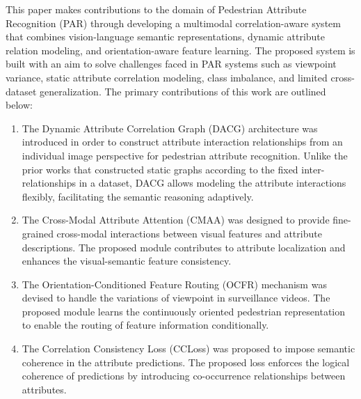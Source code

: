 \documentclass{ieeeaccess}
\begin{document}
This paper makes contributions to the domain of Pedestrian Attribute Recognition (PAR) through developing a multimodal correlation-aware system that combines vision-language semantic representations, dynamic attribute relation modeling, and orientation-aware feature learning. The proposed system is built with an aim to solve challenges faced in PAR systems such as viewpoint variance, static attribute correlation modeling, class imbalance, and limited cross-dataset generalization. The primary contributions of this work are outlined below:
\begin{enumerate}

    \item The Dynamic Attribute Correlation Graph (DACG) architecture was introduced in order to construct attribute interaction relationships from an individual image perspective for pedestrian attribute recognition. Unlike the prior works that constructed static graphs according to the fixed inter-relationships in a dataset, DACG allows modeling the attribute interactions flexibly, facilitating the semantic reasoning adaptively.
    \item The Cross-Modal Attribute Attention (CMAA) was designed to provide fine-grained cross-modal interactions between visual features and attribute descriptions. The proposed module contributes to attribute localization and enhances the visual-semantic feature consistency.
     \item The Orientation-Conditioned Feature Routing (OCFR) mechanism was devised to handle the variations of viewpoint in surveillance videos. The proposed module learns the continuously oriented pedestrian representation to enable the routing of feature information conditionally.
     \item The Correlation Consistency Loss (CCLoss) was proposed to impose semantic coherence in the attribute predictions. The proposed loss enforces the logical coherence of predictions by introducing co-occurrence relationships between attributes.
\end{enumerate}
\end{document}
